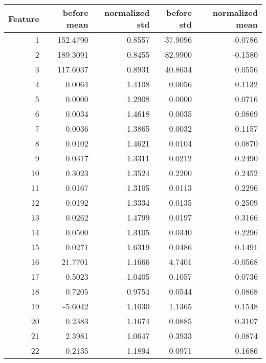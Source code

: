 \begin{tabular}{rrrrr}
\toprule
 Feature &  before mean &  normalized std &  before std &  normalized mean \\
\midrule
       1 &     152.4790 &          0.8557 &     37.9096 &          -0.0786 \\
       2 &     189.3091 &          0.8455 &     82.9900 &          -0.1580 \\
       3 &     117.6037 &          0.8931 &     40.8634 &           0.0556 \\
       4 &       0.0064 &          1.4108 &      0.0056 &           0.1132 \\
       5 &       0.0000 &          1.2908 &      0.0000 &           0.0716 \\
       6 &       0.0034 &          1.4618 &      0.0035 &           0.0869 \\
       7 &       0.0036 &          1.3865 &      0.0032 &           0.1157 \\
       8 &       0.0102 &          1.4621 &      0.0104 &           0.0870 \\
       9 &       0.0317 &          1.3311 &      0.0212 &           0.2490 \\
      10 &       0.3023 &          1.3524 &      0.2200 &           0.2452 \\
      11 &       0.0167 &          1.3105 &      0.0113 &           0.2296 \\
      12 &       0.0192 &          1.3334 &      0.0135 &           0.2509 \\
      13 &       0.0262 &          1.4799 &      0.0197 &           0.3166 \\
      14 &       0.0500 &          1.3105 &      0.0340 &           0.2296 \\
      15 &       0.0271 &          1.6319 &      0.0486 &           0.1491 \\
      16 &      21.7701 &          1.1666 &      4.7401 &          -0.0568 \\
      17 &       0.5023 &          1.0405 &      0.1057 &           0.0736 \\
      18 &       0.7205 &          0.9754 &      0.0544 &           0.0868 \\
      19 &      -5.6042 &          1.1030 &      1.1365 &           0.1548 \\
      20 &       0.2383 &          1.1674 &      0.0885 &           0.3107 \\
      21 &       2.3981 &          1.0647 &      0.3933 &           0.0874 \\
      22 &       0.2135 &          1.1894 &      0.0971 &           0.1686 \\
\bottomrule
\end{tabular}
